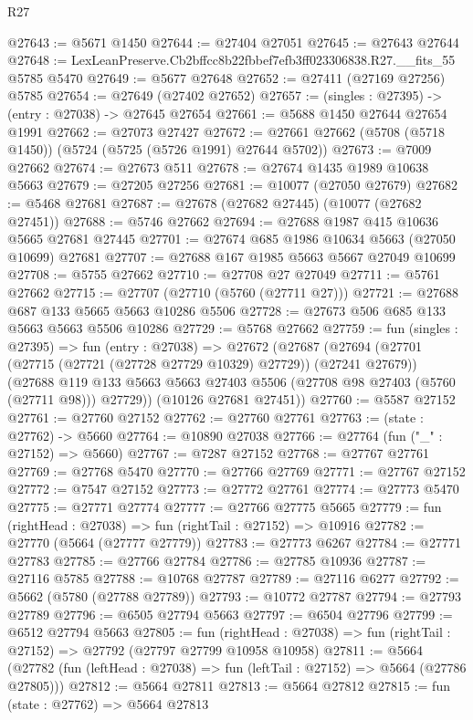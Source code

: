 \begin{lexlean}{R27}
\begin{coremodule}
@27643 := @5671 @1450
@27644 := @27404 @27051
@27645 := @27643 @27644
@27648 := LexLeanPreserve.Cb2bffcc8b22fbbef7efb3ff023306838.R27.__fits_55 @5785 @5470
@27649 := @5677 @27648
@27652 := @27411 (@27169 @27256) @5785
@27654 := @27649 (@27402 @27652)
@27657 := (singles : @27395) -> (entry : @27038) -> @27645 @27654
@27661 := @5688 @1450 @27644 @27654 @1991
@27662 := @27073 @27427
@27672 := @27661 @27662 (@5708 (@5718 @1450)) (@5724 (@5725 (@5726 @1991) @27644 @5702))
@27673 := @7009 @27662
@27674 := @27673 @511
@27678 := @27674 @1435 @1989 @10638 @5663
@27679 := @27205 @27256
@27681 := @10077 (@27050 @27679)
@27682 := @5468 @27681
@27687 := @27678 (@27682 @27445) (@10077 (@27682 @27451))
@27688 := @5746 @27662
@27694 := @27688 @1987 @415 @10636 @5665 @27681 @27445
@27701 := @27674 @685 @1986 @10634 @5663 (@27050 @10699) @27681
@27707 := @27688 @167 @1985 @5663 @5667 @27049 @10699
@27708 := @5755 @27662
@27710 := @27708 @27 @27049
@27711 := @5761 @27662
@27715 := @27707 (@27710 (@5760 (@27711 @27)))
@27721 := @27688 @687 @133 @5665 @5663 @10286 @5506
@27728 := @27673 @506 @685 @133 @5663 @5663 @5506 @10286
@27729 := @5768 @27662
@27759 := fun (singles : @27395) =>
  fun (entry : @27038) =>
  @27672
    (@27687
      (@27694
        (@27701 (@27715 (@27721 (@27728 @27729 @10329) @27729)) (@27241 @27679))
        (@27688 @119 @133 @5663 @5663 @27403 @5506 (@27708 @98 @27403 (@5760 (@27711 @98))) @27729))
      (@10126 @27681 @27451))
@27760 := @5587 @27152
@27761 := @27760 @27152
@27762 := @27760 @27761
@27763 := (state : @27762) -> @5660
@27764 := @10890 @27038
@27766 := @27764 (fun ("_" : @27152) => @5660)
@27767 := @7287 @27152
@27768 := @27767 @27761
@27769 := @27768 @5470
@27770 := @27766 @27769
@27771 := @27767 @27152
@27772 := @7547 @27152
@27773 := @27772 @27761
@27774 := @27773 @5470
@27775 := @27771 @27774
@27777 := @27766 @27775 @5665
@27779 := fun (rightHead : @27038) => fun (rightTail : @27152) => @10916
@27782 := @27770 (@5664 (@27777 @27779))
@27783 := @27773 @6267
@27784 := @27771 @27783
@27785 := @27766 @27784
@27786 := @27785 @10936
@27787 := @27116 @5785
@27788 := @10768 @27787
@27789 := @27116 @6277
@27792 := @5662 (@5780 (@27788 @27789))
@27793 := @10772 @27787
@27794 := @27793 @27789
@27796 := @6505 @27794 @5663
@27797 := @6504 @27796
@27799 := @6512 @27794 @5663
@27805 := fun (rightHead : @27038) =>
  fun (rightTail : @27152) => @27792 (@27797 @27799 @10958 @10958)
@27811 := @5664
    (@27782 (fun (leftHead : @27038) => fun (leftTail : @27152) => @5664 (@27786 @27805)))
@27812 := @5664 @27811
@27813 := @5664 @27812
@27815 := fun (state : @27762) => @5664 @27813

\end{coremodule}
\end{lexlean}
